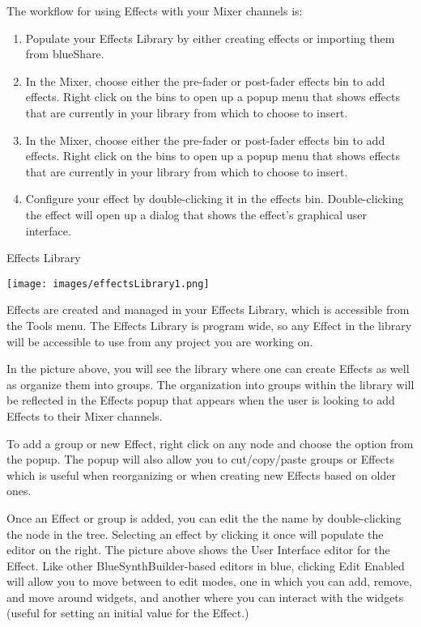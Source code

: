 The workflow for using Effects with your Mixer channels is:

\begin{enumerate}
\def\labelenumi{\arabic{enumi}.}
\item
  Populate your Effects Library by either creating effects or importing
  them from blueShare.
\item
  In the Mixer, choose either the pre-fader or post-fader effects bin to
  add effects. Right click on the bins to open up a popup menu that
  shows effects that are currently in your library from which to choose
  to insert.
\item
  In the Mixer, choose either the pre-fader or post-fader effects bin to
  add effects. Right click on the bins to open up a popup menu that
  shows effects that are currently in your library from which to choose
  to insert.
\item
  Configure your effect by double-clicking it in the effects bin.
  Double-clicking the effect will open up a dialog that shows the
  effect's graphical user interface.
\end{enumerate}

Effects Library

\texttt{[image: images/effectsLibrary1.png]}

Effects are created and managed in your Effects Library, which is
accessible from the Tools menu. The Effects Library is program wide, so
any Effect in the library will be accessible to use from any project you
are working on.

In the picture above, you will see the library where one can create
Effects as well as organize them into groups. The organization into
groups within the library will be reflected in the Effects popup that
appears when the user is looking to add Effects to their Mixer channels.

To add a group or new Effect, right click on any node and choose the
option from the popup. The popup will also allow you to cut/copy/paste
groups or Effects which is useful when reorganizing or when creating new
Effects based on older ones.

Once an Effect or group is added, you can edit the the name by
double-clicking the node in the tree. Selecting an effect by clicking it
once will populate the editor on the right. The picture above shows the
User Interface editor for the Effect. Like other BlueSynthBuilder-based
editors in blue, clicking Edit Enabled will allow you to move between to
edit modes, one in which you can add, remove, and move around widgets,
and another where you can interact with the widgets (useful for setting
an initial value for the Effect.)

